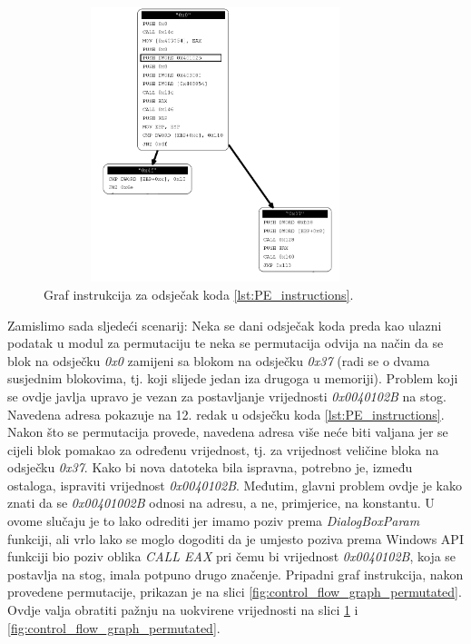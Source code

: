 \documentclass[times, utf8, diplomski, numeric]{fer}
\begin{document}
\begin{figure}[!htb]
\centering
\setlength\fboxsep{0pt}
\setlength\fboxrule{0.5pt}
\includegraphics[width=10cm, height=8cm]{slike/permutator_graph_part}
\caption{Graf instrukcija za odsječak koda \ref{lst:PE_instructions}.}
\label{fig:control_flow_graph_pe} 
\end{figure}
Zamislimo sada sljedeći scenarij: Neka se dani odsječak koda preda kao ulazni podatak u modul za permutaciju te neka se permutacija odvija na način da se blok na odsječku \emph{0x0} zamijeni sa blokom na odsječku \emph{0x37} (radi se o dvama susjednim blokovima, tj. koji slijede jedan iza drugoga u memoriji). Problem koji se ovdje javlja upravo je vezan za postavljanje vrijednosti \emph{0x0040102B} na stog. Navedena adresa pokazuje na 12. redak u odsječku koda \ref{lst:PE_instructions}. Nakon što se permutacija provede, navedena adresa više neće biti valjana jer se cijeli blok pomakao za određenu vrijednost, tj. za vrijednost veličine bloka na odsječku \emph{0x37}. Kako bi nova datoteka bila ispravna, potrebno je, između ostaloga, ispraviti vrijednost \emph{0x0040102B}. Međutim, glavni problem ovdje je kako znati da se \emph{0x00401002B} odnosi na adresu, a ne, primjerice, na konstantu. U ovome slučaju je to lako odrediti jer imamo poziv prema \emph{DialogBoxParam} funkciji, ali vrlo lako se moglo dogoditi da je umjesto poziva prema Windows API funkciji bio poziv oblika \emph{CALL EAX} pri čemu bi vrijednost \emph{0x0040102B}, koja se postavlja na stog, imala potpuno drugo značenje. Pripadni graf instrukcija, nakon provedene permutacije, prikazan je na slici \ref{fig:control_flow_graph_permutated}. Ovdje valja obratiti pažnju na uokvirene vrijednosti na slici \ref{fig:control_flow_graph_pe} i \ref{fig:control_flow_graph_permutated}.
\end{document}
